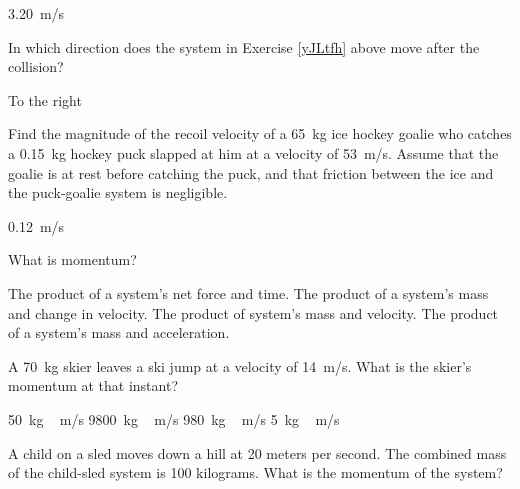\documentclass[../main-physics-problems.tex]{subfiles}
\begin{document}
\begin{questions}
\begin{solution}
\SI{3.20}{m/s}
\end{solution}


\question \label{ViY0SX}
In which direction does the system in Exercise \ref{yJLtfh} above move after the collision?

\begin{solution}
To the right
\end{solution}


\question \label{jA5zHj}
Find the magnitude of the recoil velocity of a \SI{65}{kg} ice hockey goalie who catches a \SI{0.15}{kg} hockey puck slapped at him at a velocity of \SI{53}{m/s}. Assume that the goalie is at rest before catching the puck, and that friction between the ice and the puck-goalie system is negligible.

\begin{solution}
\SI{0.12}{m/s}
\end{solution}













\clearpage

\question
What is momentum?

\begin{randomizechoices}
\choice The product of a system's net force and time.
\choice The product of a system's mass and change in velocity.
\correctchoice The product of system's mass and velocity.
\choice The product of a system's mass and acceleration.
\end{randomizechoices}

\question
A \SI{70}{kg} skier leaves a ski jump at a velocity of \SI{14}{m/s}. What is the skier's momentum at that instant?

\begin{randomizechoices}
\choice \SI{50}{kg\,m/s}
\choice \SI{9800}{kg\,m/s}
\correctchoice \SI{980}{kg\,m/s}
\choice \SI{5}{kg\,m/s}
\end{randomizechoices}

\question
A child on a sled moves down a hill at 20 meters per second. The combined mass of the child-sled system is 100 kilograms. What is the momentum of the system?


\end{questions}
\end{document}
